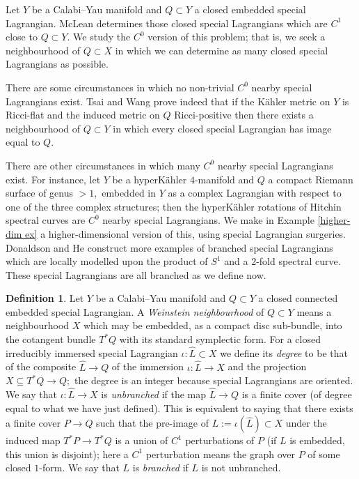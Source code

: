\documentclass{article}
\theoremstyle{plain}%
\theoremstyle{definition}
\newtheorem{dfn}[thm]{Definition}
\numberwithin{equation}{section}
\numberwithin{figure}{section}
\def\l{\label}
\def\io{\iota}
\def\sb{\subseteq}
\begin{document}
Let $Y$ be a Calabi--Yau manifold and $Q\subset Y$ a closed embedded special Lagrangian. McLean \cite{ML} determines those closed special Lagrangians which are $C^1$ close to $Q\subset Y.$ We study the $C^0$ version of this problem; that is, we seek a neighbourhood of $Q\subset X$ in which we can determine as many closed special Lagrangians as possible. 

There are some circumstances in which no non-trivial $C^0$ nearby special Lagrangians exist. Tsai and Wang \cite{TW0,TW} prove indeed that if the K\"ahler metric on $Y$ is Ricci-flat and the induced metric on $Q$ Ricci-positive then there exists a neighbourhood of $Q\subset Y$ in which every closed special Lagrangian has image equal to $Q.$ 

There are other circumstances in which many $C^0$ nearby special Lagrangians exist. For instance, let $Y$ be a hyperK\"ahler $4$-manifold and $Q$ a compact Riemann surface of genus $>1,$ embedded in $Y$ as a complex Lagrangian with respect to one of the three complex structures; then the hyperK\"ahler rotations of Hitchin spectral curves are $C^0$ nearby special Lagrangians. We make in Example \ref{higher-dim ex} a higher-dimensional version of this, using special Lagrangian surgeries. Donaldson and He \cite{Don,He,He2} construct more examples of branched special Lagrangians which are locally modelled upon the product of $S^1$ and a $2$-fold spectral curve. These special Lagrangians are all branched as we define now. 

\begin{dfn}\l{dfn: br}
Let $Y$ be a Calabi--Yau manifold and $Q\subset Y$ a closed connected embedded special Lagrangian. A {\it Weinstein neighbourhood} of $Q\subset Y$ means a neighbourhood $X$ which may be embedded, as a compact disc sub-bundle, into the cotangent bundle $T^*Q$ with its standard symplectic form. For a closed irreducibly immersed special Lagrangian $\io:\hat L\subset X$ we define its {\it degree} to be that of the composite $\hat L\to  Q$ of the immersion $\io:\hat L\to X$ and the projection $X\sb T^*Q\to Q;$ the degree is an integer because special Lagrangians are oriented. We say that $\io:\hat L\to X$ is {\it unbranched} if the map $\hat L\to Q$ is a finite cover (of degree equal to what we have just defined). This is equivalent to saying that there exists a finite cover $P\to Q$ such that the pre-image of $L:=\io(\hat L)\subset X$ under the induced map $T^*P\to T^*Q$ is a union of $C^1$ perturbations of $P$ (if $L$ is embedded, this union is disjoint); here a $C^1$ perturbation means the graph over $P$ of some closed $1$-form. We say that $L$ is {\it branched} if $L$ is not unbranched.
\end{dfn}
\end{document}
